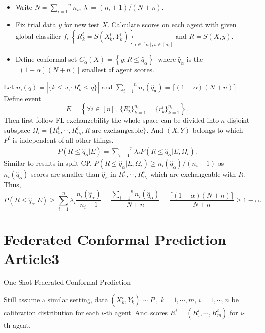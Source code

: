 \documentclass[12pt, a4paper, oneside]{article}
\begin{document}
    \begin{itemize}
        \item Write $N=\overset{n}{\underset{i=1}\sum}n_i$, $\lambda_i=(n_i+1)/(N+n)$.
        \item Fix trial data $y$ for new test $X$. Calculate scores on each agent with given global classifier $f$, $\left\{ R_k^i=S(X_k^i,Y_k^i) \right\}_{i\in[n],k\in[n_i]}$ and $R=S(X,y)$.
        \item Define conformal set $C_\alpha(X)=\left\{ y:R\leq \hat{q}_\alpha \right\}$, where $\hat{q}_\alpha$ is the $\lceil(1-\alpha)(N+n)\rceil$ smallest of agent scores.
    \end{itemize}


    Let $n_i(q)=|\{k\leq n_i:R_k^i\leq q\}|$ and $\overset{n}{\underset{i=1}\sum}n_i(\hat{q}_\alpha)=\lceil(1-\alpha)(N+n)\rceil$. Define event
    \begin{equation*}
        E=\left\{ \forall i\in[n],\ \{R_k^i\}_{k=1}^{n_i}=\{r_k^i\}_{k=1}^{n_i} \right\}.
    \end{equation*}
    Then first follow FL exchangebility the whole space can be divided into $n$ disjoint subspace $\Omega_i=\{R_1^i,\cdots,R_{n_i}^i,R\text{ are exchangeable}\}$. And $(X,Y)$ belongs to which $P^i$ is independent of all other things.
    \begin{align*}
        P(R\leq\hat{q}_\alpha\Big|E)=\overset{n}{\underset{i=1}\sum}\lambda_iP(R\leq\hat{q}_\alpha\Big|E,\Omega_i).
    \end{align*}
    Similar to results in split CP, $P(R\leq\hat{q}_\alpha\Big|E,\Omega_i)\geq n_i(\hat{q}_\alpha)/(n_i+1)$ as $n_i(\hat{q}_\alpha)$ scores are smaller than $\hat{q}_\alpha$ in $R_1^i,\cdots,R_{n_i}^i$ which are exchangeable with $R$. Thus,
    \begin{equation*}
        P(R\leq\hat{q}_\alpha\Big|E)\geq \overset{n}{\underset{i=1}\sum}\lambda_i\dfrac{n_i(\hat{q}_\alpha)}{n_i+1}=\dfrac{\overset{n}{\underset{i=1}\sum}n_i(\hat{q}_\alpha)}{N+n}=\dfrac{\lceil(1-\alpha)(N+n)\rceil}{N+n}\geq 1-\alpha.
    \end{equation*}
    

\section{Federated Conformal Prediction Article3}
    One-Shot Federated Conformal Prediction\cite{humbert2023one}


    Still assume a similar setting, data $(X_k^i,Y_k^i)\sim P^i,\ k=1,\cdots,m,\ i=1,\cdots,n$ be calibration distribution for each $i$-th agent. And scores $R^i=(R_1^i,\cdots,R_m^i)$ for $i$-th agent.
\end{document}
